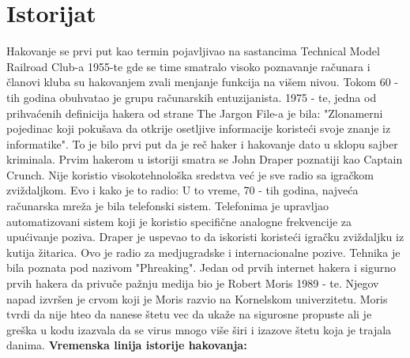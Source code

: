 \documentclass[a4paper]{article}
\begin{document}
\section{Istorijat}
Hakovanje se prvi put kao termin pojavljivao na sastancima Technical Model Railroad Club-a 1955-te gde se time smatralo visoko poznavanje računara i članovi kluba su hakovanjem zvali menjanje funkcija na višem nivou.
\newline
Tokom 60 - tih godina obuhvatao je grupu računarskih entuzijanista. 1975 - te, jedna od prihvaćenih definicija hakera od strane The Jargon File-a je bila: "Zlonamerni pojedinac koji pokušava da otkrije osetljive informacije koristeći svoje znanje iz informatike". To je bilo prvi put da je reč haker i hakovanje dato u sklopu sajber kriminala.
\newline
Prvim hakerom u istoriji smatra se John Draper poznatiji kao Captain Crunch. Nije koristio visokotehnološka sredstva već je sve radio sa igračkom zviždaljkom. Evo i kako je to radio: U to vreme, 70 - tih godina, najveća računarska mreža je bila telefonski sistem. Telefonima je upravljao automatizovani sistem koji je koristio specifične  analogne frekvencije za upućivanje poziva. Draper je uspevao to da iskoristi koristeći igračku zviždaljku iz kutija žitarica. Ovo je radio za medjugradske i internacionalne pozive. Tehnika je bila poznata pod nazivom "Phreaking".
\newline
Jedan od prvih internet hakera i sigurno prvih hakera da privuče pažnju medija bio je Robert Moris 1989 - te. Njegov napad izvršen je crvom koji je Moris razvio na Kornelskom univerzitetu. Moris tvrdi da nije hteo da nanese štetu vec da ukaže na sigurosne propuste ali je greška u kodu izazvala da se virus mnogo više širi i izazove štetu koja je trajala danima. \textbf{Vremenska linija istorije hakovanja:}
\end{document}
